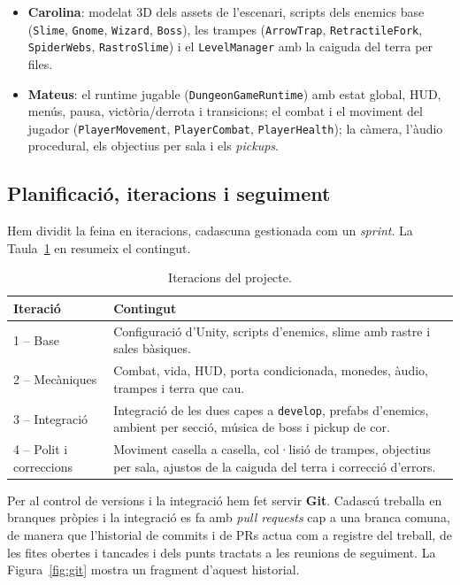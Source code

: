 \documentclass[11pt,a4paper]{article}
\begin{document}
\begin{itemize}[noitemsep]
    \item \textbf{Carolina}: modelat 3D dels assets de l'escenari, scripts dels
    enemics base (\texttt{Slime}, \texttt{Gnome}, \texttt{Wizard},
    \texttt{Boss}), les trampes (\texttt{ArrowTrap}, \texttt{RetractileFork},
    \texttt{SpiderWebs}, \texttt{RastroSlime}) i el \texttt{LevelManager} amb la
    caiguda del terra per files.
    \item \textbf{Mateus}: el runtime jugable (\texttt{DungeonGameRuntime}) amb
    estat global, HUD, menús, pausa, victòria/derrota i transicions; el combat i
    el moviment del jugador (\texttt{PlayerMovement}, \texttt{PlayerCombat},
    \texttt{PlayerHealth}); la càmera, l'àudio procedural, els objectius per sala i
    els \textit{pickups}.
\end{itemize}

\subsection{Planificació, iteracions i seguiment}

Hem dividit la feina en iteracions, cadascuna gestionada com un \textit{sprint}.
La Taula~\ref{tab:iters} en resumeix el contingut.

\begin{table}[H]
\centering
\caption{Iteracions del projecte.}
\label{tab:iters}
\begin{tabularx}{\linewidth}{lX}
\toprule
\textbf{Iteració} & \textbf{Contingut} \\
\midrule
1 -- Base & Configuració d'Unity, scripts d'enemics, slime amb rastre i sales
bàsiques. \\
2 -- Mecàniques & Combat, vida, HUD, porta condicionada, monedes, àudio, trampes
i terra que cau. \\
3 -- Integració & Integració de les dues capes a \texttt{develop}, prefabs
d'enemics, ambient per secció, música de boss i pickup de cor. \\
4 -- Polit i correccions & Moviment casella a casella, col·lisió de trampes,
objectius per sala, ajustos de la caiguda del terra i correcció d'errors. \\
\bottomrule
\end{tabularx}
\end{table}

Per al control de versions i la integració hem fet servir \textbf{Git}. Cadascú
treballa en branques pròpies i la integració es fa amb \textit{pull requests} cap
a una branca comuna, de manera que l'historial de commits i de PRs actua com a
registre del treball, de les fites obertes i tancades i dels punts tractats a les
reunions de seguiment. La Figura~\ref{fig:git} mostra un fragment d'aquest
historial.
\end{document}
